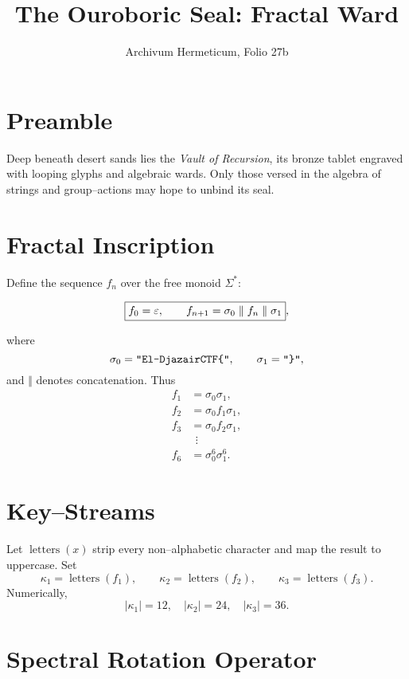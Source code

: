 \documentclass[12pt]{article}
\begin{document}
\title{The Ouroboric Seal: Fractal Ward}
\author{Archivum Hermeticum, Folio 27b}
\date{}
\maketitle

\section*{Preamble}

Deep beneath desert sands lies the \emph{Vault of Recursion}, its bronze tablet engraved with looping glyphs and algebraic wards.  
Only those versed in the algebra of strings and group--actions may hope to unbind its seal.

\section*{Fractal Inscription}

Define the sequence \(f_n\) over the free monoid \(\Sigma^{\!*}\):

\[
\boxed{%
f_0 = \varepsilon,\qquad
f_{n+1} = \sigma_0 \;\Vert\; f_n \;\Vert\; \sigma_1},
\]

where
\[
\sigma_0 = \text{\tt ``El-DjazairCTF\{"},\qquad
\sigma_1 = \text{\tt ``\}''},
\]
and \(\Vert\) denotes concatenation.  Thus
\[
\begin{aligned}
f_1 &= \sigma_0\sigma_1,\\
f_2 &= \sigma_0 f_1 \sigma_1,\\
f_3 &= \sigma_0 f_2 \sigma_1,\\
&\;\,\vdots\\
f_6 &= \sigma_0^6 \sigma_1^6.
\end{aligned}
\]

\section*{Key--Streams}

Let \(\operatorname{letters}(x)\) strip every non--alphabetic character and map the result to uppercase.
Set
\[
\kappa_1 = \operatorname{letters}(f_1),\qquad
\kappa_2 = \operatorname{letters}(f_2),\qquad
\kappa_3 = \operatorname{letters}(f_3).
\]
Numerically,
\[
|\kappa_1| = 12,\quad
|\kappa_2| = 24,\quad
|\kappa_3| = 36.
\]

\section*{Spectral Rotation Operator}
\end{document}
